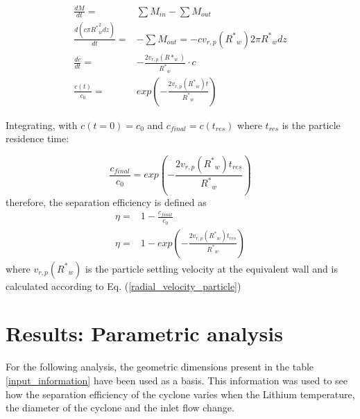 \begin{align}
	\frac{d M}{d t }=& \sum M_{in} -\sum M_{out}\\
	\frac{d(c \pi {R^*} _w^2 dz)}{dt}=& -\sum M_{out}= - c v_{r,p}({R^*} _w) 2 \pi {R^*} _w dz\\
	\frac{d c}{d t}=& - \frac{2v_{r,p}(R* _w)}{{R^*} _w} \cdot c \\
	\frac{c(t)}{c_0}=& exp \left(- \frac{2v_{r,p}({R^*} _w) t}{{R^*} _w} \right)
\end{align}

Integrating, with $c(t=0)=c_0$ and $c_{final}=c(t_{res})$ where $t_{res}$ is the particle residence time:

\begin{equation}
	\frac{c_{final}}{c_{0}}= exp \left(- \frac{2v_{r,p}({R^*} _w) t_{res}}{{R^*} _w} \right)
\end{equation}
therefore, the separation efficiency is defined as 
\begin{align} 
	\eta=&1-\frac{c_{final}}{c_{0}}\\
	\eta=&1- exp \left(- \frac{2v_{r,p}({R^*} _w) t_{res}}{{R^*} _w} \right) \label{efficiency_equation}
\end{align}
where $v_{r,p}({R^*} _w)$ is the particle settling velocity at the equivalent wall
and is calculated according to Eq. (\ref{radial_velocity_particle}) 

\section{Results: Parametric analysis}

For the following analysis, the geometric dimensions present in the table \ref{input_information} have been used as a basis. This information was used to see how the separation efficiency of the cyclone varies when the Lithium temperature, the diameter of the cyclone and the inlet flow change. 

